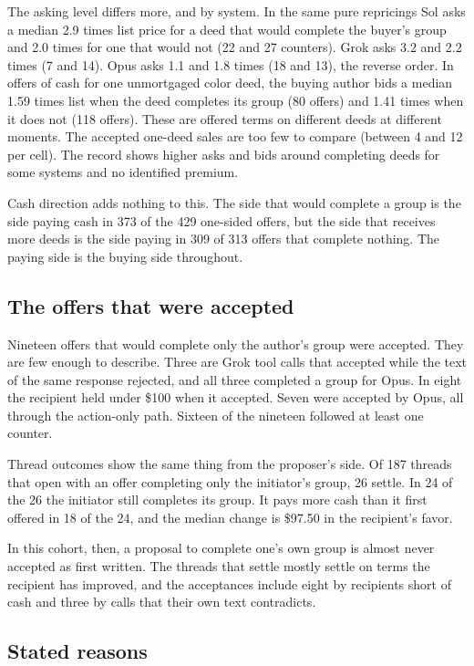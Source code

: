 The asking level differs more, and by system. In the same pure repricings Sol asks a median 2.9 times list price for a deed that would complete the buyer's group and 2.0 times for one that would not (22 and 27 counters). Grok asks 3.2 and 2.2 times (7 and 14). Opus asks 1.1 and 1.8 times (18 and 13), the reverse order. In offers of cash for one unmortgaged color deed, the buying author bids a median 1.59 times list when the deed completes its group (80 offers) and 1.41 times when it does not (118 offers). These are offered terms on different deeds at different moments. The accepted one-deed sales are too few to compare (between 4 and 12 per cell). The record shows higher asks and bids around completing deeds for some systems and no identified premium.

Cash direction adds nothing to this. The side that would complete a group is the side paying cash in 373 of the 429 one-sided offers, but the side that receives more deeds is the side paying in 309 of 313 offers that complete nothing. The paying side is the buying side throughout.

\subsection{The offers that were accepted}

Nineteen offers that would complete only the author's group were accepted. They are few enough to describe. Three are Grok tool calls that accepted while the text of the same response rejected, and all three completed a group for Opus. In eight the recipient held under \$100 when it accepted. Seven were accepted by Opus, all through the action-only path. Sixteen of the nineteen followed at least one counter.

Thread outcomes show the same thing from the proposer's side. Of 187 threads that open with an offer completing only the initiator's group, 26 settle. In 24 of the 26 the initiator still completes its group. It pays more cash than it first offered in 18 of the 24, and the median change is \$97.50 in the recipient's favor.

In this cohort, then, a proposal to complete one's own group is almost never accepted as first written. The threads that settle mostly settle on terms the recipient has improved, and the acceptances include eight by recipients short of cash and three by calls that their own text contradicts.

\subsection{Stated reasons}
\label{sec:reasons}

